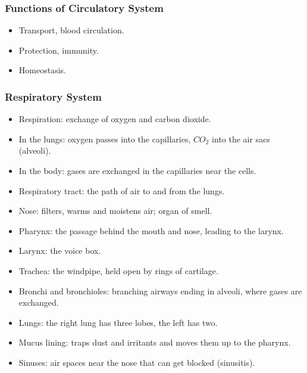 \begin{frame}[fragile]\frametitle{Functions of Circulatory System}

      \begin{itemize}
		\item Transport, blood circulation.
		\item Protection, immunity.
		\item Homeostasis.
	  \end{itemize}

\end{frame}

\begin{frame}[fragile]\frametitle{Respiratory System}

      \begin{itemize}
		\item Respiration: exchange of oxygen and carbon dioxide.
		\item In the lungs: oxygen passes into the capillaries, $CO_2$ into the air sacs (alveoli).
		\item In the body: gases are exchanged in the capillaries near the cells.
		\item Respiratory tract: the path of air to and from the lungs.
		\item Nose: filters, warms and moistens air; organ of smell.
		\item Pharynx: the passage behind the mouth and nose, leading to the larynx.
		\item Larynx: the voice box.
		\item Trachea: the windpipe, held open by rings of cartilage.
		\item Bronchi and bronchioles: branching airways ending in alveoli, where gases are exchanged.
		\item Lungs: the right lung has three lobes, the left has two.
		\item Mucus lining: traps dust and irritants and moves them up to the pharynx.
		\item Sinuses: air spaces near the nose that can get blocked (sinusitis).
	  \end{itemize}

\end{frame}

